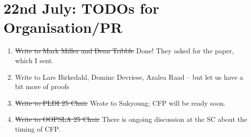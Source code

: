 \documentclass[acmsmall,review,anonymous]{acmart}\settopmatter{printfolios=true}
\begin{document}
\section{22nd  July: TODOs for Organisation/PR}

 
\begin{enumerate}
\item
\st{Write to Mark Miller and Dean Tribble} Done! They asked for the paper, which I sent.
\item
Write to Lars Birkedahl, Dominc Devriese, Azalea Raad -- but let us have a bit more of proofs
\item
\st{Write to PLDI 25 Chair} Wrote to Sukyoung; CFP will be ready soon.
\item
\st{Write to OOPSLA 25 Chair} There is ongoing discussion at the SC about the timing of CFP.

\end{enumerate}

 
\end{document}
